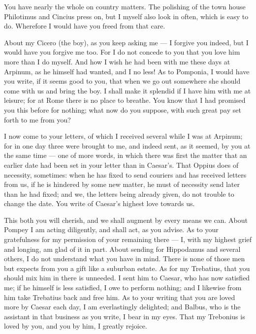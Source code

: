  You have nearly the whole on country matters. The polishing of the town house Philotimus and Cincius press on, but I myself also look in often, which is easy to do. Wherefore I would have you freed from that care.

 About my Cicero (the boy), as you keep asking me --- I forgive you indeed, but I would have you forgive me too. For I do not concede to you that you love him more than I do myself. And how I wish he had been with me these days at Arpinum, as he himself had wanted, and I no less! As to Pomponia, I would have you write, if it seems good to you, that when we go out somewhere she should come with us and bring the boy. I shall make it splendid if I have him with me at leisure; for at Rome there is no place to breathe. You know that I had promised you this before for nothing; what now do you suppose, with such great pay set forth to me from you?

 I now come to your letters, of which I received several while I was at Arpinum; for in one day three were brought to me, and indeed sent, as it seemed, by you at the same time --- one of more words, in which there was first the matter that an earlier date had been set in your letter than in Caesar's. That Oppius does of necessity, sometimes: when he has fixed to send couriers and has received letters from us, if he is hindered by some new matter, he must of necessity send later than he had fixed; and we, the letters being already given, do not trouble to change the date. You write of Caesar's highest love towards us.

 This both you will cherish, and we shall augment by every means we can. About Pompey I am acting diligently, and shall act, as you advise. As to your gratefulness for my permission of your remaining there --- I, with my highest grief and longing, am glad of it in part. About sending for Hippodamus and several others, I do not understand what you have in mind. There is none of those men but expects from you a gift like a suburban estate. As for my Trebatius, that you should mix him in there is unneeded. I sent him to Caesar, who has now satisfied me; if he himself is less satisfied, I owe to perform nothing; and I likewise from him take Trebatius back and free him. As to your writing that you are loved more by Caesar each day, I am everlastingly delighted; and Balbus, who is the assistant in that business as you write, I bear in my eyes. That my Trebonius is loved by you, and you by him, I greatly rejoice.


